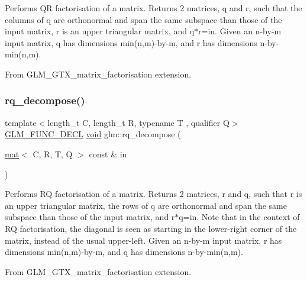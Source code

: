 Performs QR factorisation of a matrix. Returns 2 matrices, q and r, such that the columns of q are orthonormal and span the same subspace than those of the input matrix, r is an upper triangular matrix, and q$\ast$r=in. Given an n-\/by-\/m input matrix, q has dimensions min(n,m)-\/by-\/m, and r has dimensions n-\/by-\/min(n,m).

From G\+L\+M\+\_\+\+G\+T\+X\+\_\+matrix\+\_\+factorisation extension. \mbox{\label{group__gtx__matrix__factorisation_ga4e022709c9e7eaad9d7cc315d2cdb05c}} 
\subsubsection{\texorpdfstring{rq\+\_\+decompose()}{rq\_decompose()}}
{\footnotesize\ttfamily template$<$length\+\_\+t C, length\+\_\+t R, typename T , qualifier Q$>$ \\
\mbox{\hyperlink{setup_8hpp_ab2d052de21a70539923e9bcbf6e83a51}{G\+L\+M\+\_\+\+F\+U\+N\+C\+\_\+\+D\+E\+CL}} \mbox{\hyperlink{_s_d_l__opengles2__gl2ext_8h_ae5d8fa23ad07c48bb609509eae494c95}{void}} glm\+::rq\+\_\+decompose (\begin{DoxyParamCaption}\item[{\mbox{\hyperlink{structglm_1_1mat}{mat}}$<$ C, R, T, Q $>$ const \&}]{in }\end{DoxyParamCaption})}

Performs RQ factorisation of a matrix. Returns 2 matrices, r and q, such that r is an upper triangular matrix, the rows of q are orthonormal and span the same subspace than those of the input matrix, and r$\ast$q=in. Note that in the context of RQ factorisation, the diagonal is seen as starting in the lower-\/right corner of the matrix, instead of the usual upper-\/left. Given an n-\/by-\/m input matrix, r has dimensions min(n,m)-\/by-\/m, and q has dimensions n-\/by-\/min(n,m).

From G\+L\+M\+\_\+\+G\+T\+X\+\_\+matrix\+\_\+factorisation extension. 